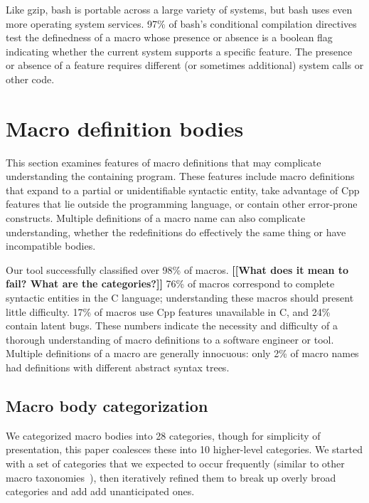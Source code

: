 \documentclass[10pt]{article}
\newcommand{\comment}[1]{\textbf{[[#1]]}}
\newcommand{\pkg}[1]{\textsf{#1}}
\begin{document}
Like \pkg{gzip}, \pkg{bash} is portable across a large variety of
systems, but \pkg{bash} uses even more operating system services.
97\% of \pkg{bash}'s conditional compilation directives
test the definedness of a macro whose presence or absence is a boolean
flag indicating whether the current system supports a specific feature.
The presence or absence of a feature requires different (or sometimes
additional) system calls or other code.


\section{Macro definition bodies}
\label{sec:macro-bodies}

This section examines features of macro definitions that may complicate
understanding the containing program.  These features include macro definitions that
expand to a partial or unidentifiable syntactic entity, take advantage of
Cpp features that lie outside the programming language, or contain other
error-prone constructs.  Multiple definitions of a macro name can also
complicate understanding, whether the redefinitions do effectively the same
thing or have incompatible bodies.

Our tool successfully classified over 98\% of macros.
\comment{What does it mean to fail?  What are the categories?}
76\% of macros correspond to complete syntactic entities in the C language;
understanding these macros should present little difficulty.  17\% of
macros use Cpp features unavailable in C, and 24\% contain latent bugs.
These numbers indicate the necessity and difficulty of a thorough
understanding of macro definitions to a software engineer or tool.
Multiple definitions of a macro are generally innocuous:  only 2\% of macro
names had definitions with different abstract syntax trees.



\subsection{Macro body categorization}
\label{sec:categorization}

We categorized macro bodies into 28 categories, though for simplicity of
presentation, this paper coalesces these into 10 higher-level categories.
We started with a set of categories that we expected to occur frequently
(similar to other macro
taxonomies~\cite{Stroustrup-DesignEvolution,Carroll95}), then iteratively
refined them to break up overly broad categories and add add unanticipated ones.
\end{document}
